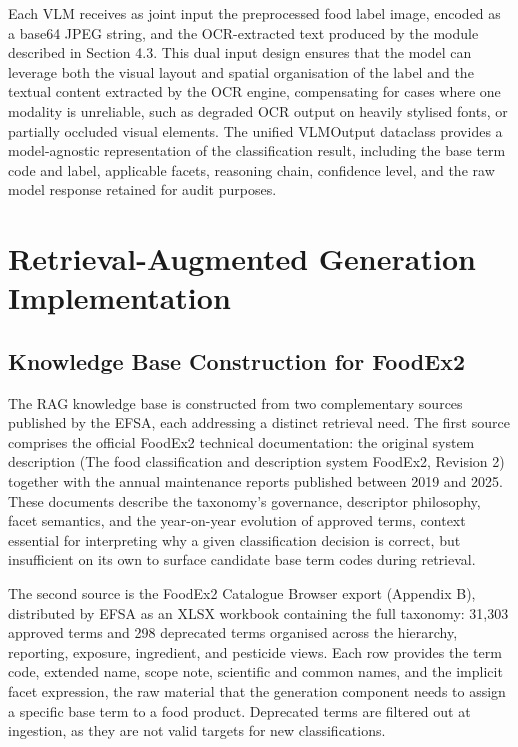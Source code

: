 Each VLM receives as joint input the preprocessed food label image, encoded as a base64 JPEG string, and the OCR-extracted text produced by the module described in Section 4.3. This dual input design ensures that the model can leverage both the visual layout and spatial organisation of the label and the textual content extracted by the OCR engine, compensating for cases where one modality is unreliable, such as degraded OCR output on heavily stylised fonts, or partially occluded visual elements. The unified VLMOutput dataclass provides a model-agnostic representation of the classification result, including the base term code and label, applicable facets, reasoning chain, confidence level, and the raw model response retained for audit purposes.

\hypertarget{retrieval-augmented-generation-implementation}{%
\section{Retrieval-Augmented Generation Implementation}\label{retrieval-augmented-generation-implementation}}

\hypertarget{knowledge-base-construction-for-foodex2}{%
\subsection{Knowledge Base Construction for FoodEx2}\label{knowledge-base-construction-for-foodex2}}

The RAG knowledge base is constructed from two complementary sources published by the EFSA, each addressing a distinct retrieval need. The first source comprises the official FoodEx2 technical documentation: the original system description (The food classification and description system FoodEx2, Revision 2) together with the annual maintenance reports published between 2019 and 2025. These documents describe the taxonomy's governance, descriptor philosophy, facet semantics, and the year-on-year evolution of approved terms, context essential for interpreting why a given classification decision is correct, but insufficient on its own to surface candidate base term codes during retrieval.

The second source is the FoodEx2 Catalogue Browser export (Appendix B), distributed by EFSA as an XLSX workbook containing the full taxonomy: 31,303 approved terms and 298 deprecated terms organised across the hierarchy, reporting, exposure, ingredient, and pesticide views. Each row provides the term code, extended name, scope note, scientific and common names, and the implicit facet expression, the raw material that the generation component needs to assign a specific base term to a food product. Deprecated terms are filtered out at ingestion, as they are not valid targets for new classifications.


